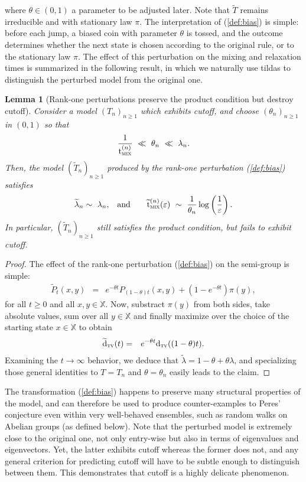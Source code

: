 \documentclass[12pt,final]{article}
\newtheorem{lemma}{Lemma}[section]
\numberwithin{equation}{section}
\newcommand{\dX}{\mathbb{X}}
\newcommand{\dtv}{{\rm d}_{\textsc{tv}}}
\newcommand{\tmix}{{\rm t}_{\textsc{mix}}}
\begin{document}
where $\theta\in(0,1)$ a parameter to be adjusted later.  Note that $\widetilde{T}$ remains irreducible and with stationary law $\pi$. The interpretation of (\ref{def:bias}) is simple: before each jump, a biased coin with parameter $\theta$ is tossed, and the outcome determines whether the next state is chosen  according to the original rule, or to the stationary law $\pi$. The effect of this perturbation on the mixing and relaxation times is summarized in the following result, in which we naturally use tildas to distinguish the perturbed model from the original one. 
 \begin{lemma}[Rank-one perturbations preserve the product condition but destroy cutoff]Consider a model $(T_n)_{n\ge 1}$ which exhibits cutoff, and choose $(\theta_n)_{n\ge 1}$  in $(0,1)$ so that
\begin{eqnarray*}
\frac{1}{\tmix^{(n)}} \ \ll \ {\theta_n} \ \ll \ \lambda_n.
\end{eqnarray*}
Then, the model $(\widetilde{T}_n)_{n\ge 1}$ produced by the rank-one perturbation (\ref{def:bias}) satisfies
\begin{eqnarray*}
\widetilde{\lambda}_n  \sim \ \lambda_n,& \quad\textrm{and}\quad & 
\widetilde{{\rm t}}^{(n)}_{\textsc{mix}}(\varepsilon) \ \sim \ \frac{1}{\theta_n}\log\left(\frac{1}{\varepsilon}\right).
\end{eqnarray*}
In particular, $(\widetilde{T}_n)_{n\ge 1}$ still satisfies the product condition, but fails to exhibit cutoff. 
\end{lemma}
\begin{proof}The effect of the rank-one perturbation (\ref{def:bias}) on the semi-group is simple: 
\begin{eqnarray*}
\widetilde{P}_t(x,y) & = &  e^{-\theta t}P_{(1-\theta)t}(x,y)+(1-e^{-\theta t})\pi(y),
\end{eqnarray*}
for all $t\ge 0$ and all $x,y\in\dX$. Now, substract $\pi(y)$ from both sides, take absolute values, sum over all $y\in\dX$ and finally maximize over the choice of the starting state $x\in\dX$ to obtain
\begin{eqnarray*}
\widetilde{\rm d}_{\textsc{tv}}(t) & = &  e^{-\theta t} {\dtv}((1-\theta)t).
\end{eqnarray*}
Examining the $t\to\infty$ behavior, we deduce that $\widetilde{\lambda} =   1-\theta+\theta \lambda$, and specializing those general identities to $T=T_n$ and $\theta=\theta_n$ easily leads to the claim.
\end{proof}
The  transformation (\ref{def:bias}) happens to preserve many structural properties of the  model, and can therefore be used to produce counter-examples to Peres' conjecture even within very well-behaved ensembles, such as random walks on Abelian groups (as defined below). Note that the perturbed model is extremely close to the original one, not only entry-wise but also in terms of eigenvalues and eigenvectors. Yet, the latter exhibits cutoff whereas the former does not,  and any general criterion for predicting cutoff will have to be subtle enough to distinguish between them. This demonstrates that cutoff is a highly delicate phenomenon. 
\end{document}
